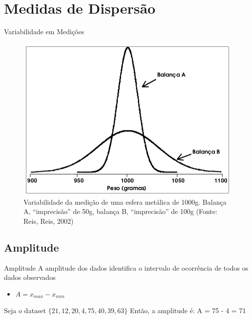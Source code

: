 \documentclass{beamer}
\begin{document}
\section{Medidas de Dispersão}

\begin{frame}{Variabilidade em Medições}
  \begin{figure}
    \includegraphics[height=0.7\textheight]{variancia}
    \caption{Variabilidade da medição de uma esfera metálica de
      1000g. Balança A, ``imprecisão'' de 50g, balança B,
      ``imprecisão'' de 100g (Fonte: Reis, Reis, 2002)}
  \end{figure}
\end{frame}

\subsection{Amplitude}
\begin{frame}{Amplitude}
  A amplitude dos dados identifica o intervalo de ocorrência de todos
  os dados observados
  \begin{itemize}
  \item $A = x_{max} - x_{min}$
  \end{itemize}
  \begin{example}
    Seja o dataset $\{21, 12, 20, 4, 75, 40, 39, 63 \}$
    Então, a amplitude é:
      A = 75 - 4 = 71
  \end{example}
\end{frame}
\end{document}
